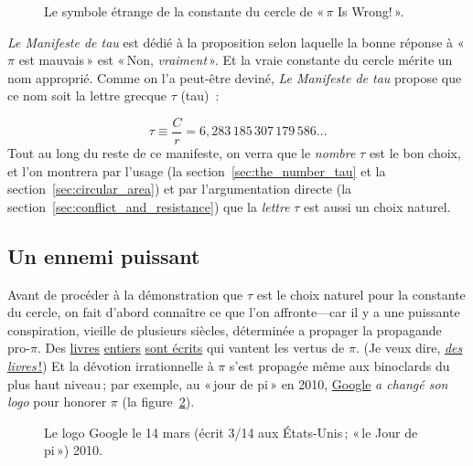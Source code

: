 \begin{figure}
\caption{Le symbole étrange de la constante du cercle de «\,$\pi$ Is Wrong!\,».\label{fig:palais_tau}}
\end{figure}

\emph{Le Manifeste de tau} est dédié à la proposition selon laquelle la bonne
réponse à «\,$\pi$ est mauvais\,» est «\,Non, \emph{vraiment}\,». Et la vraie
constante du cercle mérite un nom approprié. Comme on l'a peut-être deviné,
\emph{Le Manifeste de tau} propose que ce nom soit la lettre grecque $\tau$
(tau)~:

\begin{equation}
\label{eq:tau}
\tau \equiv \frac{C}{r} = 6{,}283\,185\,307\,179\,586\ldots
\end{equation}
Tout au long du reste de ce manifeste, on verra que le \emph{nombre} $\tau$ est
le bon choix, et l'on montrera par l'usage (la section~\ref{sec:the_number_tau}
et la section~\ref{sec:circular_area}) et par l'argumentation directe (la
section~\ref{sec:conflict_and_resistance}) que la \emph{lettre} $\tau$ est aussi
un choix naturel.

\subsection{Un ennemi puissant} %
 \label{sec:a_powerful_enemy}
 
Avant de procéder à la démonstration que $\tau$ est le choix naturel pour la
constante du cercle, on fait d'abord connaître ce que l'on affronte---car il y a
une puissante conspiration, vieille de plusieurs siècles, déterminée a propager
la propagande pro-$\pi$. Des
\href{https://www.amazon.fr/fascinant-nombre-ESSAIS-SCIEN-ebook/dp/B07D3SYP5X/}{livres}
\href{https://www.amazon.fr/1-000-000-Décimales-Nombre-Plus-Connu/dp/B085DMM9XV/}{entiers}
\href{https://www.amazon.fr/Autour-du-nombre-pi-HR-ACT-SC-INDUS-ebook/dp/B081HGQSQJ/}{sont
écrits} qui vantent les vertus de $\pi$. (Je veux dire,
\href{https://www.amazon.com/exec/obidos/ISBN=0802713327/}{\emph{des
livres}\,!}) Et la dévotion irrationnelle à $\pi$ s'est propagée même aux
binoclards du plus haut niveau\,; par exemple, au «\,jour de pi\,» en 2010,
\href{https://www.google.com/}{Google} \emph{a changé son logo} pour honorer
$\pi$ (la figure~\ref{fig:google_pi_day.}).

\begin{figure}
\begin{center}
\end{center}
\caption{Le logo Google le 14 mars (écrit 3/14 aux États-Unis\,; «\,le Jour de
pi\,») 2010.\label{fig:google_pi_day.}}
\end{figure}

